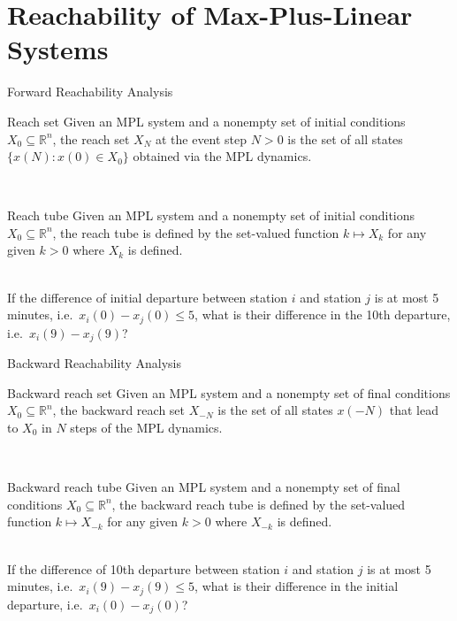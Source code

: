 \documentclass[aspectratio=169]{beamer} %
\begin{document}
	\section{Reachability of Max-Plus-Linear Systems}
	
	\begin{frame}{Forward Reachability Analysis}
		
		\begin{block}{Reach set}
			Given an MPL system and a nonempty set of initial conditions $X_0 \subseteq \mathbb{R}^n$, the reach set $X_N$ at the event step $N > 0$ is the set of all states $\{ x(N) : x(0) \in X_0 \}$ obtained via the MPL dynamics.
		\end{block}
		
		\-\\
		
		\begin{block}{Reach tube}
			Given an MPL system and a nonempty set of initial conditions $X_0 \subseteq \mathbb{R}^n$, the reach tube is defined by the set-valued function $k \mapsto X_k$ for any given $k > 0$ where $X_k$ is defined.
		\end{block}
		
		\-\\
		
		If the difference of initial departure between station $i$ and station $j$ is at most 5 minutes, i.e.\ $x_i(0) - x_j(0) \leq 5$, what is their difference in the 10th departure, i.e.\ $x_i(9) - x_j(9)$?
		
	\end{frame}
	
	\begin{frame}{Backward Reachability Analysis}
		
		\begin{block}{Backward reach set}
			Given an MPL system and a nonempty set of final conditions $X_0 \subseteq \mathbb{R}^n$, the backward reach set $X_{-N}$ is the set of all states $x(-N)$ that lead to $X_0$ in $N$ steps of the MPL dynamics.
		\end{block}
		
		\-\\
		
		\begin{block}{Backward reach tube}
			Given an MPL system and a nonempty set of final conditions $X_0 \subseteq \mathbb{R}^n$, the backward reach tube is defined by the set-valued function $k \mapsto X_{-k}$ for any given $k > 0$ where $X_{-k}$ is defined.
		\end{block}
		
		\-\\
		
		If the difference of 10th departure between station $i$ and station $j$ is at most 5 minutes, i.e.\ $x_i(9) - x_j(9) \leq 5$, what is their difference in the initial departure, i.e.\ $x_i(0) - x_j(0)$?
		
	\end{frame}
	
\end{document}
